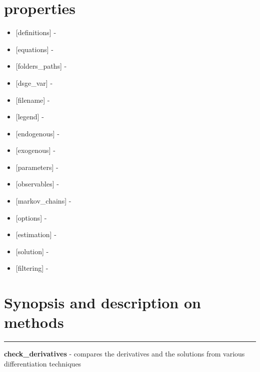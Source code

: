 \documentclass[letterpaper,10pt,english]{sphinxmanual}
\begin{document}
\section{properties}
\label{classes/models/@dsge/dsge:properties}\begin{itemize}
\item {} 
{[}definitions{]} -

\item {} 
{[}equations{]} -

\item {} 
{[}folders\_paths{]} -

\item {} 
{[}dsge\_var{]} -

\item {} 
{[}filename{]} -

\item {} 
{[}legend{]} -

\item {} 
{[}endogenous{]} -

\item {} 
{[}exogenous{]} -

\item {} 
{[}parameters{]} -

\item {} 
{[}observables{]} -

\item {} 
{[}markov\_chains{]} -

\item {} 
{[}options{]} -

\item {} 
{[}estimation{]} -

\item {} 
{[}solution{]} -

\item {} 
{[}filtering{]} -

\end{itemize}


\section{Synopsis and description on methods}
\label{classes/models/@dsge/dsge:synopsis-and-description-on-methods}

\bigskip\hrule{}\bigskip

\label{classes/models/@dsge/dsge:check-derivatives}
\textbf{check\_derivatives} - compares the derivatives and the solutions from various differentiation techniques
\end{document}
